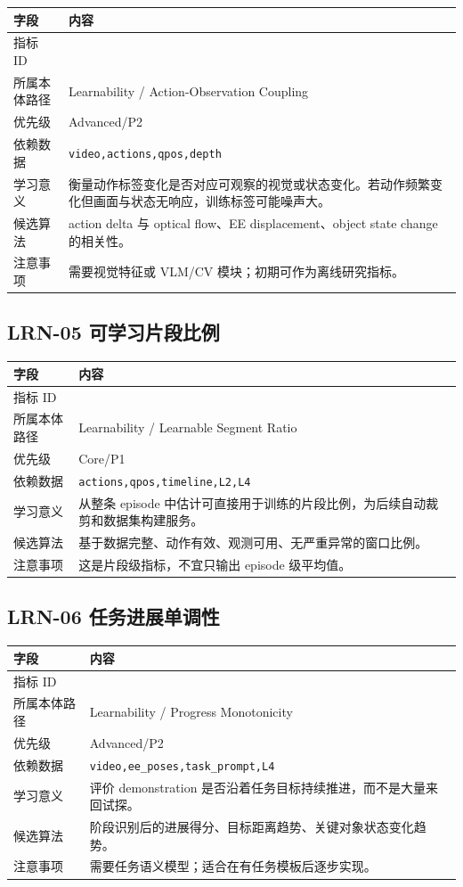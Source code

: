 \documentclass[UTF8,zihao=-4,oneside,openany]{ctexrep}
\newcommand{\Code}[1]{\texttt{#1}}
\newcommand{\MID}[1]{\texttt{\seqsplit{#1}}}
\begin{document}
\begin{longtable}{L{3.6cm} L{9.6cm}}
\toprule
字段 & 内容 \\
\midrule
指标 ID & \MID{LRN-04} \\
所属本体路径 & Learnability / Action-Observation Coupling \\
优先级 & Advanced/P2 \\
依赖数据 & \Code{video,actions,qpos,depth} \\
学习意义 & 衡量动作标签变化是否对应可观察的视觉或状态变化。若动作频繁变化但画面与状态无响应，训练标签可能噪声大。 \\
候选算法 & action delta 与 optical flow、EE displacement、object state change 的相关性。 \\
注意事项 & 需要视觉特征或 VLM/CV 模块；初期可作为离线研究指标。 \\
\bottomrule
\end{longtable}

\subsection{LRN-05 可学习片段比例}

\begin{longtable}{L{3.6cm} L{9.6cm}}
\toprule
字段 & 内容 \\
\midrule
指标 ID & \MID{LRN-05} \\
所属本体路径 & Learnability / Learnable Segment Ratio \\
优先级 & Core/P1 \\
依赖数据 & \Code{actions,qpos,timeline,L2,L4} \\
学习意义 & 从整条 episode 中估计可直接用于训练的片段比例，为后续自动裁剪和数据集构建服务。 \\
候选算法 & 基于数据完整、动作有效、观测可用、无严重异常的窗口比例。 \\
注意事项 & 这是片段级指标，不宜只输出 episode 级平均值。 \\
\bottomrule
\end{longtable}

\subsection{LRN-06 任务进展单调性}

\begin{longtable}{L{3.6cm} L{9.6cm}}
\toprule
字段 & 内容 \\
\midrule
指标 ID & \MID{LRN-06} \\
所属本体路径 & Learnability / Progress Monotonicity \\
优先级 & Advanced/P2 \\
依赖数据 & \Code{video,ee\_poses,task\_prompt,L4} \\
学习意义 & 评价 demonstration 是否沿着任务目标持续推进，而不是大量来回试探。 \\
候选算法 & 阶段识别后的进展得分、目标距离趋势、关键对象状态变化趋势。 \\
注意事项 & 需要任务语义模型；适合在有任务模板后逐步实现。 \\
\bottomrule
\end{longtable}
\end{document}
